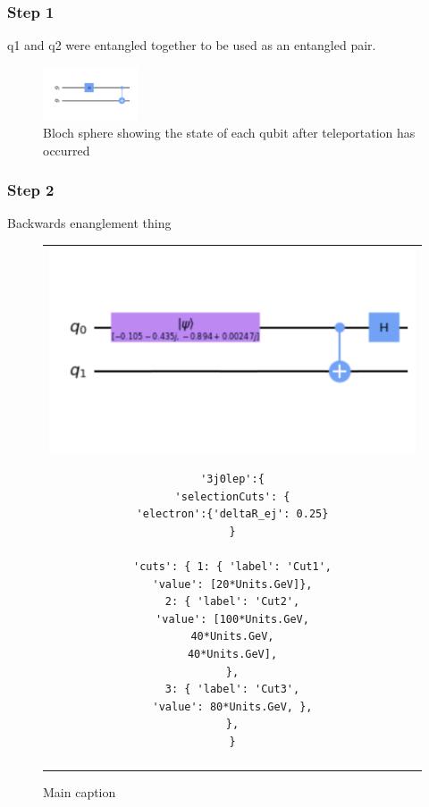 \subsubsection{Step 1}
q1 and q2 were entangled together to be used as an entangled pair.
\begin{figure}[h]
    \centering
    \includegraphics[width=0.25\textwidth]{lab3/images/Step1.png}
    \caption{Bloch sphere showing the state of each qubit after teleportation has occurred}
    \label{fig:step1}
\end{figure}


\subsubsection{Step 2}
Backwards enanglement thing

\begin{figure}[h]
\centering
\begin{tabular}{c}
\begin{minipage}[c]{.40\linewidth}
\centering
\includegraphics[width=\textwidth]{lab3/images/Step2.png}
\end{minipage}
\hfill
\begin{minipage}[c]{.45\linewidth}
\begin{verbatim}
'3j0lep':{
'selectionCuts': {
'electron':{'deltaR_ej': 0.25}
}

'cuts': { 1: { 'label': 'Cut1',
'value': [20*Units.GeV]},
2: { 'label': 'Cut2',
'value': [100*Units.GeV,
40*Units.GeV,
40*Units.GeV],
},
3: { 'label': 'Cut3',
'value': 80*Units.GeV, },
},
}
\end{verbatim}
\end{minipage} \\
\\ %
\end{tabular}
\caption{Main caption}
\label{MainILabel}
\end{figure}




